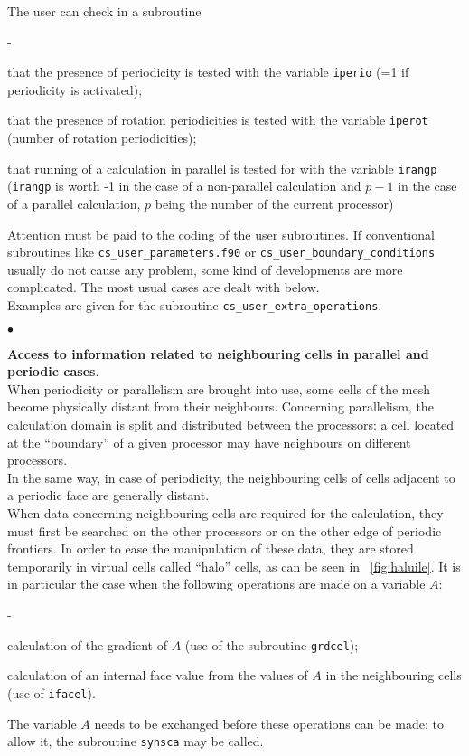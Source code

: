 {{{The user can check in a subroutine
\begin{list}{-}{}
\item that the presence of periodicity is tested with the variable
      \texttt{iperio} (=1 if periodicity is activated);
\item that the presence of rotation periodicities is tested with the variable
      \texttt{iperot} (number of rotation periodicities);
\item that running of a calculation in parallel is tested for with the
      variable \texttt{irangp} (\texttt{irangp} is worth -1 in the case of a
      non-parallel calculation and $p-1$ in the case of a parallel calculation,
      $p$ being the number of the current processor)
\end{list}
Attention must be paid to the coding of the user subroutines. If
conventional subroutines like \texttt{cs\_user\_parameters.f90} or \texttt{cs\_user\_boundary\_conditions}
usually do not cause any problem, some kind of developments are more
complicated. The most usual cases are dealt with below. \\ Examples are
given for the subroutine \texttt{cs\_user\_extra\_operations}.
\begin{list}{$\bullet$}{}
\item {\bf Access to information related to neighbouring cells in
      parallel and periodic cases}.\\
When periodicity or parallelism are brought into use, some cells of the
      mesh become physically distant from their neighbours. Concerning
      parallelism, the calculation domain is split and distributed
      between the processors: a cell located at the ``boundary'' of a
      given processor may have neighbours on different processors. \\
In the same way, in case of periodicity, the neighbouring cells of cells
      adjacent to a periodic face are generally distant. \\
When data concerning neighbouring cells are required for the
      calculation, they must first be searched on the other processors
      or on the other edge of periodic frontiers. In order to ease the
      manipulation of these data, they are stored temporarily in virtual
      cells called ``halo'' cells, as can be seen in \figurename~\ref{fig:haluile}.
It is in particular the case when the following operations are made on a
      variable $A$:
\begin{list}{-}{}
\item calculation of the gradient of $A$ (use of the subroutine \texttt{grdcel});
\item calculation of an internal face value from the values of $A$  in
      the neighbouring cells (use of \texttt{ifacel}).
\end{list}
The variable $A$ needs to be exchanged before these operations can be
      made: to allow it, the subroutine \texttt{synsca} may be called.


\end{list}}}}
